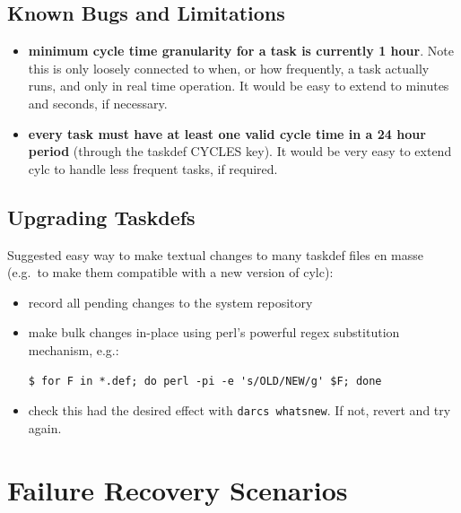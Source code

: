 \documentclass[11pt,a4paper]{article}
\begin{document}
\subsection{Known Bugs and Limitations}

\begin{itemize}
    \item {\bf minimum cycle time granularity for a task is currently 1
        hour}. Note this is only loosely connected to when, or how
        frequently, a task actually runs, and only in real time
        operation. It would be easy to extend to minutes and seconds, if
        necessary.

    \item {\bf every task must have at least one valid cycle time in a
        24 hour period} (through the taskdef CYCLES key). 
        It would be very easy to extend cylc to handle less frequent
        tasks, if required. 

\end{itemize}

\subsection{Upgrading Taskdefs}

Suggested easy way to make textual changes to many taskdef files en
masse (e.g.\ to make them compatible with a new version of cylc):

\begin{itemize}
    \item record all pending changes to the system repository
    \item make bulk changes in-place using perl's powerful regex 
       substitution mechanism, e.g.:
       \begin{lstlisting}
$ for F in *.def; do perl -pi -e 's/OLD/NEW/g' $F; done
       \end{lstlisting}
   \item check this had the desired effect with 
       \lstinline=darcs whatsnew=. If not, revert and try again.
\end{itemize}


\section{Failure Recovery Scenarios}
\label{Failure Recovery Scenarios}
\end{document}
